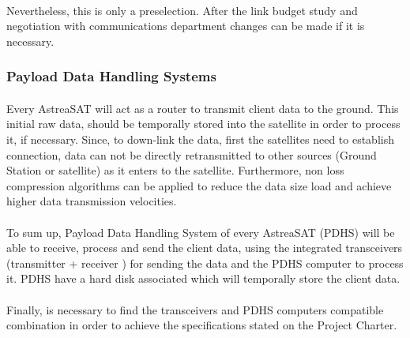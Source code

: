 \paragraph{} Nevertheless, this is only a preselection. After the link budget study and negotiation with communications department changes can be made if it is necessary.

\subsubsection{Payload Data Handling Systems}
\paragraph{} Every AstreaSAT will act as a router to transmit client data to the ground. This initial raw data, should be temporally stored into the satellite in order to process it, if necessary. Since, to down-link the data, first the satellites need to establish connection, data can not be directly retransmitted to other sources (Ground Station or satellite) as it enters to the satellite. Furthermore, non loss compression algorithms can be applied to reduce the data size load and achieve higher data transmission velocities.

\paragraph{}To sum up, Payload Data Handling System of every AstreaSAT (PDHS) will be able to receive, process and send the client data, using the integrated transceivers (transmitter + receiver )  for sending the data and the PDHS computer to process it. PDHS have a hard disk associated which will temporally store the client data.

\paragraph{}Finally, is necessary to find the transceivers and PDHS computers compatible combination in order to achieve the specifications stated on the Project Charter.


